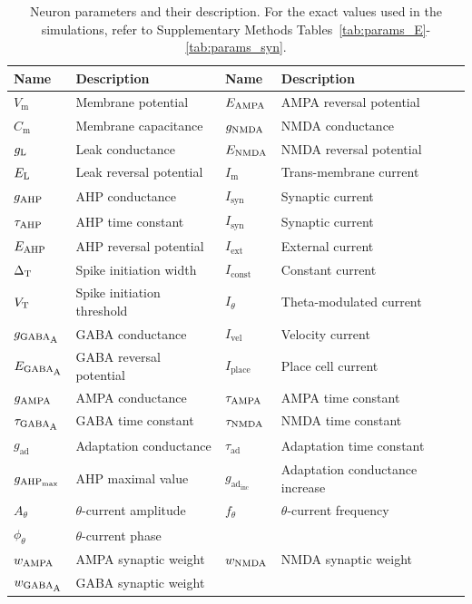 \documentclass[a4paper,12pt]{article}
\newcommand{\ssc}[3]{\ensuremath{#1_{\text{#2}_{\text{#3}}}}}
\newcommand{\Cm}       {\ssc{C}      {m}     {}}
\newcommand{\Vm}       {\ssc{V}      {m}     {}}
\newcommand{\Imem}     {\ssc{I}      {m}     {}}
\newcommand{\Isyn}     {\ssc{I}      {syn}   {}}
\newcommand{\Iext}     {\ssc{I}      {ext}   {}}
\newcommand{\Iconst}   {\ssc{I}      {const} {}}
\newcommand{\Itheta}   {\ssc{I}      {$\theta$}{}}
\newcommand{\Atheta}   {\ssc{A}      {$\theta$}{}}
\newcommand{\ftheta}   {\ssc{f}      {$\theta$}{}}
\newcommand{\phitheta} {\ssc{\phi}   {$\theta$}{}}
\newcommand{\Ivel}     {\ssc{I}      {vel}   {}}
\newcommand{\Iplace}   {\ssc{I}      {place} {}}
\newcommand{\gL}       {\ssc{g}      {\scriptsize{L}}  {}}
\newcommand{\EL}       {\ssc{E}      {\scriptsize{L}}  {}}
\newcommand{\gAHP}     {\ssc{g}      {\scriptsize{AHP}}{}}
\newcommand{\gAHPmax}  {\ssc{g}      {\scriptsize{AHP}}{max}}
\newcommand{\EAHP}     {\ssc{E}      {\scriptsize{AHP}}{}}
\newcommand{\tauAHP}   {\ssc{\tau}   {\scriptsize{AHP}}{}}
\newcommand{\VT}       {\ssc{V}      {\scriptsize{T}}  {}}
\newcommand{\gGABAA}   {\ssc{g}      {\scriptsize{GABA}}{\scriptsize{A}}}
\newcommand{\EGABAA}   {\ssc{E}      {\scriptsize{GABA}}{\scriptsize{A}}}
\newcommand{\tauGABAA} {\ssc{\tau}   {\scriptsize{GABA}}{\scriptsize{A}}}
\newcommand{\gAMPA}    {\ssc{g}      {\scriptsize{AMPA}}{}}
\newcommand{\EAMPA}    {\ssc{E}      {\scriptsize{AMPA}}{}}
\newcommand{\tauAMPA}  {\ssc{\tau}   {\scriptsize{AMPA}}{}}
\newcommand{\gNMDA}    {\ssc{g}      {\scriptsize{NMDA}}{}}
\newcommand{\ENMDA}    {\ssc{E}      {\scriptsize{NMDA}}{}}
\newcommand{\tauNMDA}  {\ssc{\tau}   {\scriptsize{NMDA}}{}}
\newcommand{\gad}      {\ssc{g}      {ad}{}}
\newcommand{\tauad}    {\ssc{\tau}   {ad}{}}
\newcommand{\gadinc}   {\ssc{g}      {ad}{inc}}
\newcommand{\deltaT}   {\ssc{\Delta} {\scriptsize{T}}{}}
\newcommand{\wAMPA   }{\ssc{w}      {\scriptsize{AMPA}}{}}
\newcommand{\wNMDA   }{\ssc{w}      {\scriptsize{NMDA}}{}}
\newcommand{\wGABAA  }{\ssc{w}      {\scriptsize{GABA}}{\scriptsize{A}}}
\begin{document}
\renewcommand{\tablename}{Supplementary Methods Table}
\begin{table}
    \centering
    \begin{tabular}{l | l || l | l}
        Name       & Description               & Name       & Description               \\
        \hline\hline
        $\Vm$      & Membrane potential        & $\EAMPA$   & AMPA reversal potential   \\
        $\Cm$      & Membrane capacitance      & $\gNMDA$   & NMDA conductance          \\
        $\gL$      & Leak conductance          & $\ENMDA$   & NMDA reversal potential   \\
        $\EL$      & Leak reversal potential   & $\Imem$    & Trans-membrane current    \\
        $\gAHP$    & AHP conductance           & $\Isyn$    & Synaptic current          \\
        $\tauAHP$  & AHP time constant         & $\Isyn$    & Synaptic current          \\
        $\EAHP$    & AHP reversal potential    & $\Iext$    & External current          \\
        $\deltaT$  & Spike initiation width    & $\Iconst$  & Constant current          \\
        $\VT$      & Spike initiation threshold& $\Itheta$  & Theta-modulated current   \\
        $\gGABAA$  & GABA conductance          & $\Ivel$    & Velocity current          \\
        $\EGABAA$  & GABA reversal potential   & $\Iplace$  & Place cell current        \\
        $\gAMPA$   & AMPA conductance          & $\tauAMPA$ & AMPA time constant        \\
        $\tauGABAA$& GABA time constant        & $\tauNMDA$ & NMDA time constant        \\
        $\gad$     & Adaptation conductance    & $\tauad$   & Adaptation time constant  \\
        $\gAHPmax$ & AHP maximal value         & $\gadinc$  & Adaptation conductance increase \\
        $\Atheta$  & $\theta$-current amplitude& $\ftheta$  & $\theta$-current frequency  \\
        $\phitheta$& $\theta$-current phase    &            & \\
        $\wAMPA$   & AMPA synaptic weight      & $\wNMDA$   & NMDA synaptic weight      \\
        $\wGABAA$  & GABA synaptic weight      &            &
    \end{tabular}
    \internallinenumbers
    \caption{Neuron parameters and their description. For the exact values used
    in the simulations, refer to Supplementary Methods
    Tables~\ref{tab:params_E}-\ref{tab:params_syn}.}
    \label{tab:neuron_params}
\end{table}
\end{document}
